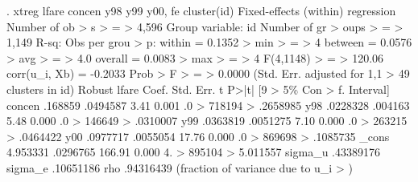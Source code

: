 . xtreg lfare concen y98 y99 y00, fe cluster(id)
{\smallskip}
Fixed-effects (within) regression               Number of ob
> s                                                         
>       =                                                   
>              4,596
Group variable: id                              Number of gr
> oups                                                      
>       =                                                   
>              1,149
{\smallskip}
R-sq:                                           Obs per grou
> p:
     within  = 0.1352                                       
>   min                                                     
>       =                                                   
>                  4
     between = 0.0576                                       
>   avg                                                     
>       =                                                   
>                4.0
     overall = 0.0083                                       
>   max                                                     
>       =                                                   
>                  4
{\smallskip}
                                                F(4,1148)   
>       =                                                   
>             120.06
corr(u_i, Xb)  = -0.2033                        Prob > F    
>       =                                                   
>             0.0000
{\smallskip}
                                 (Std. Err. adjusted for 1,1
> 49 clusters in id)
             {\VBAR}               Robust
       lfare {\VBAR}      Coef.   Std. Err.      t    P>|t|     [9
> 5\% Con                                                    
>       f. Interval]
      concen {\VBAR}    .168859   .0494587     3.41   0.001     .0
> 718194                                                    
>           .2658985
         y98 {\VBAR}   .0228328    .004163     5.48   0.000     .0
> 146649                                                    
>           .0310007
         y99 {\VBAR}   .0363819   .0051275     7.10   0.000     .0
> 263215                                                    
>           .0464422
         y00 {\VBAR}   .0977717   .0055054    17.76   0.000     .0
> 869698                                                    
>           .1085735
       _cons {\VBAR}   4.953331   .0296765   166.91   0.000     4.
> 895104                                                    
>           5.011557
     sigma_u {\VBAR}  .43389176
     sigma_e {\VBAR}  .10651186
         rho {\VBAR}  .94316439   (fraction of variance due to u_i
> )
{\smallskip}
